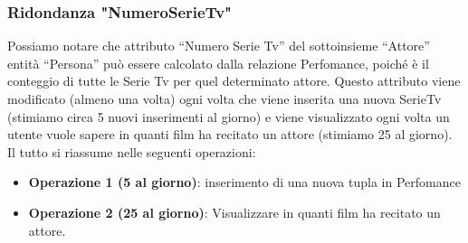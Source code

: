 \documentclass[12pt,a4paper]{article}
\begin{document}
\subsubsection{Ridondanza "NumeroSerieTv"}
Possiamo notare che attributo “Numero Serie Tv” del sottoinsieme “Attore” entità “Persona” può essere calcolato dalla relazione Perfomance, poiché è il conteggio di tutte le Serie Tv per quel determinato attore.
Questo attributo viene modificato (almeno una volta) ogni volta che viene inserita una nuova SerieTv (stimiamo circa 5 nuovi inserimenti al giorno)
e viene visualizzato ogni volta un utente vuole sapere in quanti film ha recitato un attore (stimiamo 25 al giorno).
Il tutto si riassume nelle seguenti operazioni:
\begin{itemize}
    \item \textbf{Operazione 1 (5 al giorno)}: inserimento di una nuova tupla in Perfomance
    \item \textbf{Operazione 2 (25 al giorno)}: Visualizzare in quanti film ha recitato un attore.
\end{itemize}
\end{document}
